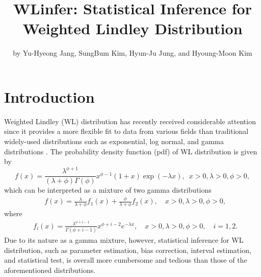 \title{WLinfer: Statistical Inference for Weighted Lindley Distribution}
\author{by Yu-Hyeong Jang, SungBum Kim, Hyun-Ju Jung, and Hyoung-Moon Kim}

\maketitle


\section{Introduction}

Weighted Lindley (WL) distribution has recently received considerable attention since it provides a more flexible fit to data from various fields than traditional widely-used distributions such as exponential, log normal, and gamma distributions \citep{ghitany:2011,mazucheli:2013}.
The probability density function (pdf) of WL distribution is given by
\begin{equation*}
f(x) = \frac{\lambda^{\phi+1}}{(\lambda+\phi)\Gamma(\phi)}{x}^{\phi-1}(1+{x})\exp(-\lambda {x}),
\hspace{6pt}x>0,\lambda>0,\phi>0,
\end{equation*} 
which can be interpreted as a mixture of two gamma distributions
\begin{equation*}
\begin{aligned}
&f(x) = \frac{\lambda}{\lambda+\phi}f_{1}(x)+\frac{\phi}{\lambda+\phi}f_{2}(x),\quad x>0,\lambda>0,\phi>0,
\end{aligned}
\end{equation*}
where
\begin{equation*}
\begin{aligned}
&f_{i}(x) = \frac{\lambda^{\phi+i-1}}{\Gamma(\phi+i-1)}x^{\phi+i-2}e^{-\lambda x},\quad x>0,\lambda>0,\phi>0,\quad i=1,2.
\end{aligned}
\end{equation*}  
Due to its nature as a gamma mixture, however, statistical inference for WL distribution, such as parameter estimation, bias correction, interval estimation, and statistical test, is overall more cumbersome and tedious than those of the aforementioned distributions. 

